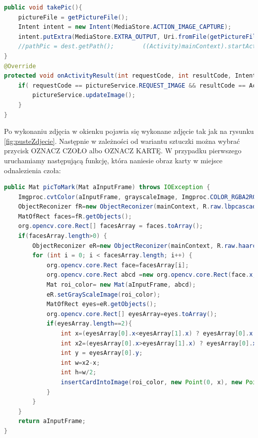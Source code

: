 \begin{lstlisting}[language=Java]
public void takePic(){
    pictureFile = getPictureFile();
    Intent intent = new Intent(MediaStore.ACTION_IMAGE_CAPTURE);
    intent.putExtra(MediaStore.EXTRA_OUTPUT, Uri.fromFile(getPictureFile()));
    //pathPic = dest.getPath();        ((Activity)mainContext).startActivityForResult(intent, REQUEST_IMAGE);
}
@Override
protected void onActivityResult(int requestCode, int resultCode, Intent data) {
    if( requestCode == pictureService.REQUEST_IMAGE && resultCode == Activity.RESULT_OK ){
        pictureService.updateImage();
    }
}
\end{lstlisting}

Po wykonaniu zdjęcia w okienku pojawia się wykonane zdjęcie tak jak na rysunku \ref{fig:pusteZdjecie}. Następnie w zależności od wariantu sztuczki można wybrać przycisk OZNACZ CZOŁO albo OZNACZ KARTĘ. W przypadku pierwszego uruchamiamy następującą funkcję, która naniesie obraz karty w miejsce odnalezienia czoła:

\begin{lstlisting}[language=Java]
public Mat picToMark(Mat aInputFrame) throws IOException {
    Imgproc.cvtColor(aInputFrame, grayscaleImage, Imgproc.COLOR_RGBA2RGB);
    ObjectReconizer fR=new ObjectReconizer(mainContext, R.raw.lbpcascade_frontalface, mainContext.getString(R.string.cascadeFrontalFaceXML), grayscaleImage, 1.3, 3);
    MatOfRect faces=fR.getObjects();
    org.opencv.core.Rect[] facesArray = faces.toArray();
    if(facesArray.length>0) {
        ObjectReconizer eR=new ObjectReconizer(mainContext, R.raw.haarcascade_lefteye_2splits, "haarcascade_lefteye_2splits.xml", grayscaleImage, 1.3, 3);
        for (int i = 0; i < facesArray.length; i++) {
            org.opencv.core.Rect face=facesArray[i];
            org.opencv.core.Rect abcd =new org.opencv.core.Rect(face.x, face.y, face.width, face.height);
            Mat roi_color= new Mat(aInputFrame, abcd);
            eR.setGrayScaleImage(roi_color);
            MatOfRect eyes=eR.getObjects();
            org.opencv.core.Rect[] eyesArray=eyes.toArray();
            if(eyesArray.length==2){
                int x=(eyesArray[0].x<eyesArray[1].x) ? eyesArray[0].x:eyesArray[1].x;
                int x2=(eyesArray[0].x>eyesArray[1].x) ? eyesArray[0].x+eyesArray[0].width:eyesArray[1].x+eyesArray[1].width;
                int y = eyesArray[0].y;
                int w=x2-x;
                int h=w/2;
                insertCardIntoImage(roi_color, new Point(0, x), new Point(h, w+x));
            }
        }
    }
    return aInputFrame;
}
\end{lstlisting}

